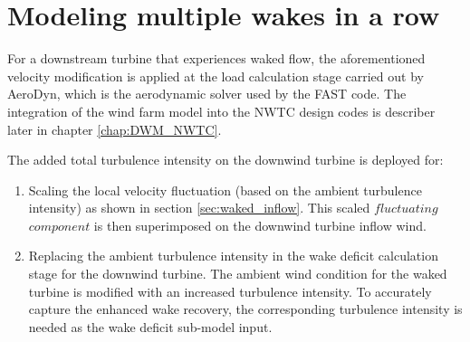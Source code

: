 \documentclass{umthesis}
\begin{document}
\section{Modeling multiple wakes in a row}\label{sec:wakes_row}
For a downstream turbine that experiences waked flow, the aforementioned velocity modification is applied at the load calculation stage carried out by AeroDyn, which is the aerodynamic solver used by the FAST code. The integration of the wind farm model into the NWTC design codes is describer later in chapter \ref{chap:DWM_NWTC}.

The added total turbulence intensity on the downwind turbine is deployed for:
\begin{enumerate}
  \item Scaling the local velocity fluctuation (based on the ambient turbulence intensity) as shown in section \ref{sec:waked_inflow}. This scaled $fluctuating$ $component$ is then superimposed on the downwind turbine inflow wind.
  \item Replacing the ambient turbulence intensity in the wake deficit calculation stage for the downwind turbine. The ambient wind condition for the waked turbine is modified with an increased turbulence intensity. To accurately capture the enhanced wake recovery, the corresponding turbulence intensity is needed as the wake deficit sub-model input.
\end{enumerate}
\end{document}

